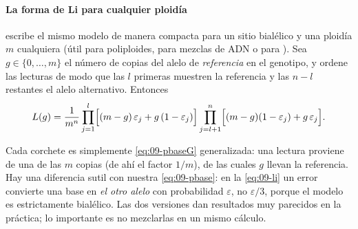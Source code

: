 \paragraph{La forma de Li para cualquier ploidía} \textcite{c09-li2011stat} escribe el mismo modelo de manera compacta para un sitio bialélico y una ploidía $m$ cualquiera (útil para poliploides, para mezclas de ADN o para ). Sea $g\in\{0,\dots,m\}$ el número de copias del alelo de \emph{referencia} en el genotipo, y ordene las lecturas de modo que las $l$ primeras muestren la referencia y las $n-l$ restantes el alelo alternativo. Entonces
\begin{equation}\label{eq:09-li}
L(g) = \frac{1}{m^{n}}\prod_{j=1}^{l}\Bigl[(m-g)\,\varepsilon_j + g\,(1-\varepsilon_j)\Bigr]\prod_{j=l+1}^{n}\Bigl[(m-g)(1-\varepsilon_j) + g\,\varepsilon_j\Bigr].
\end{equation}

\begin{simbolos}
\end{simbolos}

Cada corchete es simplemente \cref{eq:09-pbaseG} generalizada: una lectura proviene de una de las $m$ copias (de ahí el factor $1/m$), de las cuales $g$ llevan la referencia. Hay una diferencia sutil con nuestra \cref{eq:09-pbase}: en la \cref{eq:09-li} un error convierte una base en \emph{el otro alelo} con probabilidad $\varepsilon$, no $\varepsilon/3$, porque el modelo es estrictamente bialélico. Las dos versiones dan resultados muy parecidos en la práctica; lo importante es no mezclarlas en un mismo cálculo.

